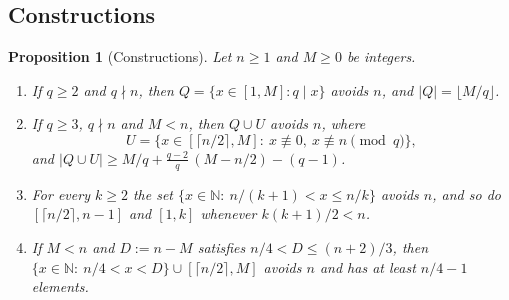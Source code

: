 \documentclass[11pt,reqno]{amsart}
\numberwithin{equation}{section}
\newtheorem{proposition}[theorem]{Proposition}
\theoremstyle{definition}
\theoremstyle{remark}
\newcommand{\N}{\mathbb{N}}
\newcommand{\card}[1]{\lvert #1\rvert}
\newcommand{\floor}[1]{\lfloor #1\rfloor}
\newcommand{\ceil}[1]{\lceil #1\rceil}
\begin{document}
\subsection{Constructions}

\begin{proposition}[Constructions]\label{prop:constructions}
Let $n\ge1$ and $M\ge0$ be integers.
\begin{enumerate}[label=\textup{(\alph*)}]
\item If $q\ge2$ and $q\nmid n$, then $Q=\{x\in[1,M]:q\mid x\}$ avoids $n$, and $\card Q=\floor{M/q}$.
\item If $q\ge3$, $q\nmid n$ and $M<n$, then $Q\cup U$ avoids $n$, where
\[
 U=\bigl\{x\in[\ceil{n/2},M]:\ x\not\equiv0,\ x\not\equiv n\pmod q\bigr\},
\]
and $\card{Q\cup U}\ge M/q+\frac{q-2}q\,(M-n/2)-(q-1)$.
\item For every $k\ge2$ the set $\{x\in\N:\ n/(k+1)<x\le n/k\}$ avoids $n$, and so do $[\ceil{n/2},n-1]$ and $[1,k]$ whenever $k(k+1)/2<n$.
\item If $M<n$ and $D:=n-M$ satisfies $n/4<D\le(n+2)/3$, then $\{x\in\N:\ n/4<x<D\}\cup[\ceil{n/2},M]$ avoids $n$ and has at least $n/4-1$ elements.
\end{enumerate}
\end{proposition}
\end{document}
